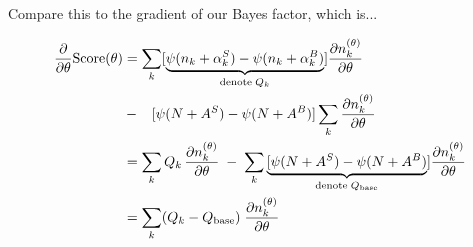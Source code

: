 \documentclass[12pt]{article}
\begin{document}
Compare this to the gradient of our Bayes factor, which is...

\begin{align}
\frac{\partial}{\partial\theta}\text{Score}(\theta) 
&= \sum_k [\underbrace{\psi(n_k + \alpha^S_k) - \psi(n_k + \alpha^B_k)}_{\text{denote} \; Q_k}] \frac{\partial n_k^{(\theta)}}{\partial\theta} \notag\\
& - \;\;\; [\psi(N+A^S) - \psi(N+A^B)]\sum_k \frac{\partial n_k^{(\theta)}}{\partial\theta}\\
&= \sum_k  Q_k \, \frac{\partial n_k^{(\theta)}}{\partial\theta}\;-\;
\sum_k
\underbrace{ [\psi(N+A^S) - \psi(N+A^B)}_{\text{denote} \; Q_\text{base}}] \frac{\partial n_k^{(\theta)}}{\partial\theta}\\
&= \sum_k (Q_k - Q_\text{base}) \; \frac{\partial n_k^{(\theta)}}{\partial\theta} \label{eq:score-grad-1d}
\end{align}
\end{document}
